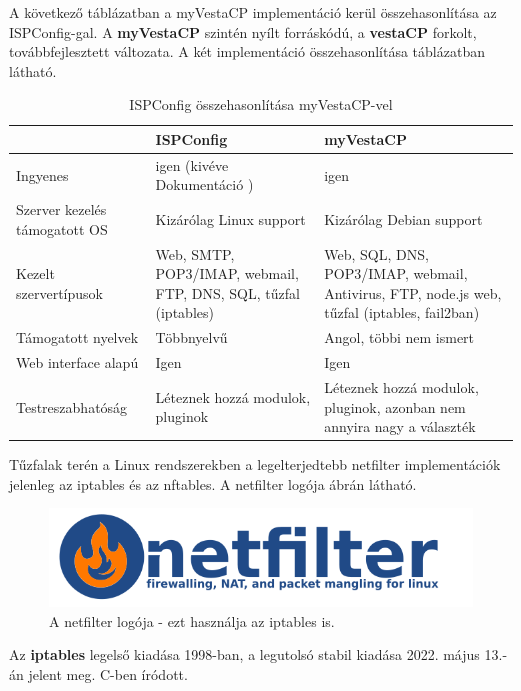 A következő táblázatban a myVestaCP implementáció kerül összehasonlítása az ISPConfig-gal.
A \textbf{myVestaCP} szintén nyílt forráskódú, a \textbf{vestaCP} forkolt, továbbfejlesztett változata. A két implementáció összehasonlítása  táblázatban látható.

\begin{table}[h]
\centering
\caption{ISPConfig \cite{ispconfig2} összehasonlítása myVestaCP-vel \cite{myvestacp}}
\label{tab:ispconfig_vs_myvestacp}
\begin{tabularx}{\linewidth}{l|L|L}
 & ISPConfig & myVestaCP \\
\hline
Ingyenes & igen (kivéve Dokumentáció \cite{ispconfig_doc}) & igen \\
\hline
Szerver kezelés támogatott OS & Kizárólag Linux support & Kizárólag Debian support \\
\hline
Kezelt szervertípusok & Web, SMTP, POP3/IMAP, webmail, FTP, DNS, SQL, tűzfal (iptables) & Web, SQL, DNS, POP3/IMAP, webmail, Antivirus, FTP, node.js web, tűzfal (iptables, fail2ban) \cite{vestacpdocs} \\
\hline
Támogatott nyelvek & Többnyelvű & Angol, többi nem ismert \\
\hline
Web interface alapú & Igen & Igen \\
\hline
Testreszabhatóság & Léteznek hozzá modulok, pluginok & Léteznek hozzá modulok, pluginok, azonban nem annyira nagy a választék \\
\end{tabularx}
\end{table}

Tűzfalak terén a Linux rendszerekben a legelterjedtebb netfilter implementációk jelenleg az iptables és az nftables. A netfilter logója  ábrán látható.

\begin{figure}[h]
\centering
\includegraphics[scale=0.5]{images/netfilter-logo3.png}
\caption{A netfilter logója \cite{netfilter_logo} - ezt használja az iptables is.}
\label{fig:netfilter_logo}
\end{figure}

Az \textbf{iptables} legelső kiadása 1998-ban, a legutolsó stabil kiadása 2022. május 13.-án jelent meg. C-ben íródott. \cite{iptables}

